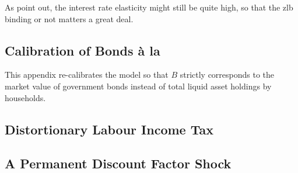 \documentclass[12pt]{article} %
\numberwithin{equation}{section} %
\begin{document}
\begin{refsection}
\begin{appendices}
As \textcite{gl2017} point out, the interest rate elasticity might still be quite high, so that the \Gls{zlb} binding or not matters a great deal.

\subsection{Calibration of Bonds à la \textcite{bayer2023}}
\label{sec-app:robust-bonds}

This appendix re-calibrates the model so that $B$ strictly corresponds to the market value of government bonds instead of total liquid asset holdings by households.

\subsection{Distortionary Labour Income Tax}
\label{sec-app:robust-labour-tax}

\subsection{A Permanent Discount Factor Shock}
\label{sec-app:robust-beta-shock}

\end{appendices}
\newpage
\thispagestyle{plain}
\renewcommand*{\thepage}{A-\Roman{page}} %
\thispagestyle{plain}
\printbibliography[heading=subbibliography, title={Appendix References}]
\end{refsection}

\newpage
\thispagestyle{plain}
\end{document}
